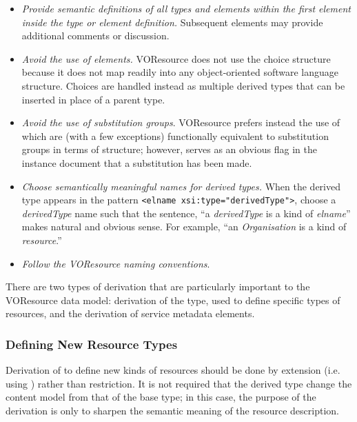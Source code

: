 \documentclass[11pt,a4paper]{ivoa}
\begin{document}
\begin{itemize}
  \item \emph{Provide semantic definitions of all types and elements within
       the first  element inside
       the type or element definition.}  Subsequent
        elements may provide
       additional comments or discussion.  

  \item \emph{Avoid the use of  elements.}
       VOResource does not use the choice structure because it does
       not map readily into any object-oriented software language
       structure.  Choices are handled instead as multiple derived
       types that can be inserted in place of a parent type.  

  \item \emph{Avoid the use of substitution groups}.  VOResource
       prefers instead the use of  which are
       (with a few exceptions) functionally equivalent to substitution
       groups in terms of structure; however, 
       serves as an obvious flag in the instance document that a
       substitution has been made. 

  \item \emph{Choose semantically meaningful names for derived
       types.}  When the derived type appears in the pattern
       \verb|<elname xsi:type="derivedType">|,
       choose a \textit{derivedType} name such that the sentence, ``a
       \textit{derivedType} is a kind of \textit{elname}'' makes natural
       and obvious sense.  For example, ``an \textit{Organisation} is a
       kind of \textit{resource}.'' 

  \item \emph{Follow the VOResource naming conventions}. 
\end{itemize}



There are two types of derivation that are particularly important to
the VOResource data model:  derivation of the 
type, used to define specific types of resources, and the derivation
of service metadata elements.  


\subsubsection{Defining New Resource Types}
\label{sect:definingresourcetypes}


Derivation of  to define new kinds of
resources should be done by extension (i.e. using 
) rather than restriction.  It is
not required that the derived type change the content model from that
of the  base type; in this case, the purpose
of the derivation is only to sharpen the semantic meaning of the
resource description.  
\end{document}
